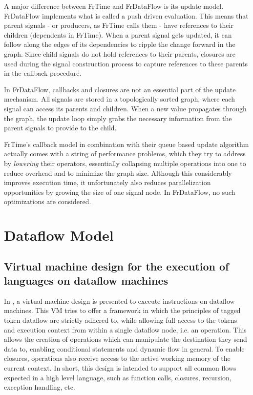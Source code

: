 A major difference between FrTime and FrDataFlow is its update model. FrDataFlow implements what is called a push driven evaluation. This means that parent signals - or producers, as FrTime calls them - have references to their children (dependents in FrTime). When a parent signal gets updated, it can follow along the edges of its dependencies to ripple the change forward in the graph. Since child signals do not hold references to their parents, closures are used during the signal construction process to capture references to these parents in the callback procedure.

In FrDataFlow, callbacks and closures are not an essential part of the update mechanism. All signals are stored in a topologically sorted graph, where each signal can access its parents and children. When a new value propagates through the graph, the update loop simply grabs the necessary information from the parent signals to provide to the child.

FrTime's callback model in combination with their queue based update algorithm actually comes with a string of performance problems, which they try to address by \textit{lowering} \cite{burchett_lowering:_2007} their operators, essentially collapsing multiple operations into one to reduce overhead and to minimize the graph size. Although this considerably improves execution time, it unfortunately also reduces parallelization opportunities by growing the size of one signal node. In FrDataFlow, no such optimizations are considered. 

\section{Dataflow Model}

\subsection{Virtual machine design for the execution of languages on dataflow machines}

In \cite{saey_extensible_2017}, a virtual machine design is presented to execute instructions on dataflow machines. This VM tries to offer a framework in which the principles of tagged token dataflow are strictly adhered to, while allowing full access to the tokens and execution context from within a single dataflow node, i.e. an operation. This allows the creation of operations which can manipulate the destination they send data to, enabling conditional statements and dynamic flow in general. To enable closures, operations also receive access to the active working memory of the current context. 
In short, this design is intended to support all common flows expected in a high level language, such as function calls, closures, recursion, exception handling, etc.

